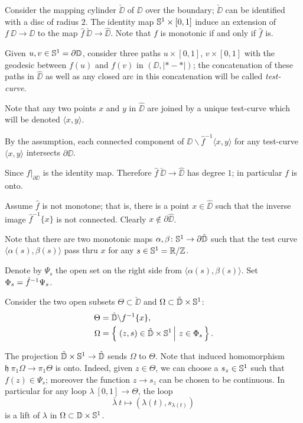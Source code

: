 \documentclass{article}
\begin{document}
Consider the mapping cylinder $\check \DD$ of $\DD$ over the boundary;
$\check \DD$ can be identified with a disc of radius $2$.
The identity map $\mathbb{S}^1\times [0,1]$ induce an extension of $f\:\DD\to \DD$ to the map 
$\hat f\:\check \DD\to \hat \DD$.
Note that $f$ is monotonic if and only if $\hat f$ is.

Given $u,v\in\mathbb{S}^1=\partial\mathbb{D}$, consider three paths $u\times [0,1]$, $v\times[0,1]$ with the geodesic between $f(u)$ and $f(v)$ in $(\DD,|{*}-{*}|)$;
the concatenation of these paths in $\hat \DD$ as well as any closed arc in this concatenation will be called \emph{test-curve}.

Note that any two points $x$ and $y$ in $\hat \DD$ are joined by a unique test-curve which will be denoted $\langle x,y\rangle$.

By the assumption, each connected component of $\DD\backslash \hat f^{-1}\langle x,y\rangle$ for any test-curve $\langle x,y\rangle$ intersects $\partial \hat \DD$.

Since $\hat f|_{\partial\DD}$ is the identity map.
Therefore $\hat f\:\check \DD\to \hat \DD$ has degree $1$;
in particular $f$ is onto.

Assume $\hat f$ is not monotone;
that is, there is a point $x\in \hat\DD$ such that the inverse image $\hat f^{-1}\{x\}$ is not connected.
Clearly $x\notin\partial \hat\DD$.

Note that there are two monotonic maps $\alpha,\beta\colon\mathbb{S}^1\to \partial\hat{\mathbb{D}}$ such that the test curve
$\langle \alpha(s),\beta(s) \rangle$ pass thru $x$ for any $s\in\mathbb{S}^1=\mathbb{R}/\mathbb{Z}$.

Denote by $\Psi_s$ the open set on the right side from  $\langle \alpha(s),\beta(s) \rangle$.
Set $\Phi_s\zz=\hat f^{-1}\Psi_s$.

Consider the two open subsets $\Theta\subset\check \DD$ and $\Omega\subset \check {\mathbb{D}}\times\mathbb{S}^1$:
\begin{align*}
\Theta&=\hat \DD\backslash f^{-1}\{x\},
\\
\Omega&=\set{(z,s)\in \hat \DD\times\SS^1}{z\in \Phi_s}.
\end{align*}

The  projection $\hat {\mathbb{D}}\times\mathbb{S}^1\to \hat {\mathbb{D}}$ sends $\Omega$ to $\Theta$.
Note that induced homomorphism $\mathfrak{h}\:\pi_1\Omega\to \pi_1\Theta$ is onto.
Indeed, given $z\in \Theta$, we can choose a $s_z\in\mathbb{S}^1$ such that 
$f(z)\in \Psi_s$;
moreover the function $z\to s_z$ can be chosen to be continuous.
In particular for any loop $\lambda\:[0,1]\to\Theta$, the loop 
\[\bar\lambda\:t\mapsto (\lambda(t),s_{\lambda(t)})\]
is a lift of $\lambda$ in $\Omega\subset \mathbb{D}\times\mathbb{S}^1$.
\end{document}
